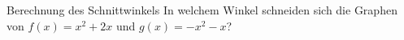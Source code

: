 \begin{bsp}
    {Berechnung des Schnittwinkels}{}
    In welchem Winkel schneiden sich die Graphen von $f(x)=x^2+2x$ und $g(x)=-x^2-x$?




    \vspace*{4cm}

    \phantom{text}


    \clearpage
    \phantom{text}
    
     \vspace*{6cm}

\end{bsp}









